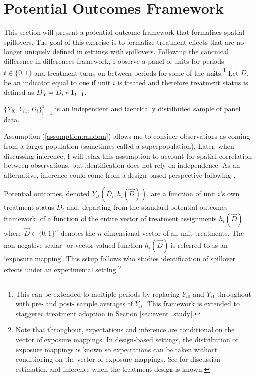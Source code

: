 \documentclass[11pt]{article}
\begin{document}
\section{Potential Outcomes Framework}
\label{sec:po_framework}

This section will present a potential outcome framework that formalizes spatial spillovers. The goal of this exercise is to formalize treatment effects that are no longer uniquely defined in settings with spillovers. Following the canonical difference-in-differences framework, I observe a panel of units for periods $t \in \{0,1\}$ and treatment turns on between periods for some of the units.\footnote{This can be extended to multiple periods by replacing $Y_{i0}$ and $Y_{i1}$ throughout with pre- and post- sample averages of $Y_{it}$. This framework is extended to staggered treatment adoption in Section \ref{sec:event_study}.} Let $D_{i}$ be an indicator equal to one if unit $i$ is treated and therefore treatment status is defined as $D_{it} = D_{i} * \mathbf{1}_{t = 1}$.

\begin{assumption}\label{assumption:random}
    $\{ Y_{i0}, Y_{i1}, D_{i} \}_{i = 1}^{n}$ is an independent and identically distributed sample of panel data.
\end{assumption}

Assumption (\ref{assumption:random}) allows me to consider observations as coming from a larger population (sometimes called a superpopulation). Later, when discussing inference, I will relax this assumption to account for spatial correlation between observations, but identification does not rely on independence. As an alternative, inference could come from a design-based perspective following \citet{Athey_Imbens_2021}.

Potential outcomes, denoted $Y_{it}(D_i, h_i(\vec{D}))$, are a function of unit $i$'s own treatment-status $D_i$ and, departing from the standard potential outcomes framework, of a function of the entire vector of treatment assignments $h_i(\vec{D})$ where $\vec{D} \in \{0,1 \}^n$ denotes the $n$-dimensional vector of all unit treatments. The non-negative scalar- or vector-valued function $h_i(\vec{D})$ is referred to as an `exposure mapping'. This setup follows \citet{Vazquez-Bare_2019} who studies identification of spillover effects under an experimental setting.\footnote{Note that throughout, expectations and inference are conditional on the vector of exposure mappings. In design-based settings, the distribution of exposure mappings is known so expectations can be taken without conditioning on the vector of exposure mappings. See \citet{Savje_Aronow_Hudgens_2021} for discussion estimation and inference when the treatment design is known.}
\end{document}
